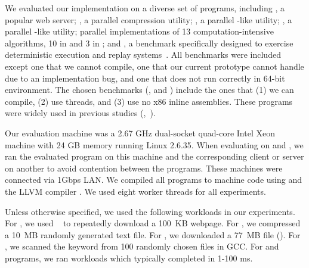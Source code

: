We evaluated our \peregrine implementation on a diverse set of \peregrinenprog programs,
including \apache, a popular web server; \pbzip, a parallel compression
utility; \aget, a parallel -like utility; \pfscan, a parallel
-like utility; parallel implementations of 13
computation-intensive algorithms, 10 in \splash and 3 in \parsec; and
\racey, a benchmark specifically designed to exercise deterministic
execution and replay systems~\cite{racy-stress}.  All \splash benchmarks
were included except one that we cannot compile, one that our current prototype
cannot handle due to an implementation bug, and one that does not run
correctly in 64-bit environment.  The chosen \parsec benchmarks
(\blackscholes, \swaptions and \streamcluster) include the ones that (1)
we can compile, (2) use threads, and (3) use no x86 inline assemblies.
These programs were widely used in previous studies (\eg,~\cite{lu:concurrency-bugs,syncfinder:osdi10,grace:oopsla09}).

Our evaluation machine was a 2.67 GHz dual-socket quad-core Intel Xeon
machine with 24 GB memory running Linux 2.6.35.  When evaluating \peregrine on
\apache and \aget, we ran the evaluated program on this machine and the
corresponding client or server on another to avoid contention
between the programs.  These machines were connected via 1Gbps LAN.  We
compiled all programs to machine code using  and the
LLVM compiler .  We used eight worker threads for all
experiments.

Unless otherwise specified, we used the following workloads in our
experiments.  For \apache, we used \ab~\cite{apachebench} to repeatedly
download a 100~KB webpage. For \pbzip, we compressed a 10~MB randomly
generated text file.
For \aget, we downloaded a 77~MB file (). 
For \pfscan, we scanned the keyword  from 100 randomly chosen
files in GCC.  For \splash and \parsec programs, 
we ran workloads which typically completed in 1-100 ms.

